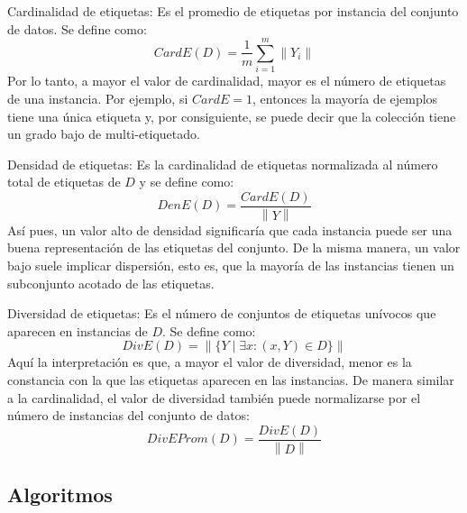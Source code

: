 \begin{description}
	\item{Cardinalidad de etiquetas}: Es el promedio de etiquetas por instancia
	      del conjunto de datos. Se define como:
	      \begin{equation}
		      \label{eq:mll_card}
		      CardE(D) = \frac{1}{m} \sum_{i=1}^{m} \left\|Y_{i}\right\|
	      \end{equation}
	      Por lo tanto, a mayor el valor de cardinalidad, mayor es el número de
	      etiquetas de una instancia. Por ejemplo, si $CardE = 1$, entonces la
	      mayoría de ejemplos tiene una única etiqueta y, por consiguiente, se puede
	      decir que la colección tiene un grado bajo de multi-etiquetado.
	\item{Densidad de etiquetas}: Es la cardinalidad de etiquetas normalizada al
	      número total de etiquetas de $D$ y se define como:
	      \begin{equation}
		      DenE(D) = \frac{CardE(D)}{\left\|Y\right\|}
	      \end{equation}
	      Así pues, un valor alto de densidad significaría que cada instancia puede
	      ser una buena representación de las etiquetas del conjunto. De la misma
	      manera, un valor bajo suele implicar dispersión, esto es, que la mayoría
	      de las instancias tienen un subconjunto acotado de las etiquetas.
	\item{Diversidad de etiquetas}: Es el número de conjuntos de etiquetas
	      unívocos que aparecen en instancias de $D$. Se define como:
	      \begin{equation}
		      DivE(D) = \left\|\{Y \mid \exists x: (x, Y) \in D\}\right\|
	      \end{equation}
	      Aquí la interpretación es que, a mayor el valor de diversidad, menor es la
	      constancia con la que las etiquetas aparecen en las instancias. De manera
	      similar a la cardinalidad, el valor de diversidad también puede
	      normalizarse por el número de instancias del conjunto de datos:
	      \begin{equation}
		      DivEProm(D) = \frac{DivE(D)}{\left\|D\right\|}
	      \end{equation}
\end{description}

\subsection{Algoritmos}

